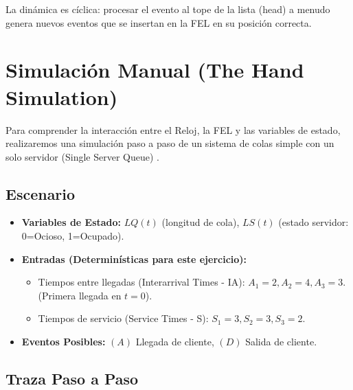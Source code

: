 \documentclass[11pt, letterpaper]{article}
\begin{document}
La dinámica es cíclica: procesar el evento al tope de la lista (head) a menudo genera nuevos eventos que se insertan en la FEL en su posición correcta.

\section{Simulación Manual (The Hand Simulation)}

Para comprender la interacción entre el Reloj, la FEL y las variables de estado, realizaremos una simulación paso a paso de un sistema de colas simple con un solo servidor (Single Server Queue) .

\subsection{Escenario}
\begin{itemize}
    \item \textbf{Variables de Estado:} $LQ(t)$ (longitud de cola), $LS(t)$ (estado servidor: 0=Ocioso, 1=Ocupado).
    \item \textbf{Entradas (Determinísticas para este ejercicio):}
    \begin{itemize}
        \item Tiempos entre llegadas (Interarrival Times - IA): $A_1=2, A_2=4, A_3=3$. (Primera llegada en $t=0$).
        \item Tiempos de servicio (Service Times - S): $S_1=3, S_2=3, S_3=2$.
    \end{itemize}
    \item \textbf{Eventos Posibles:} $(A)$ Llegada de cliente, $(D)$ Salida de cliente.
\end{itemize}

\subsection{Traza Paso a Paso}
\end{document}
